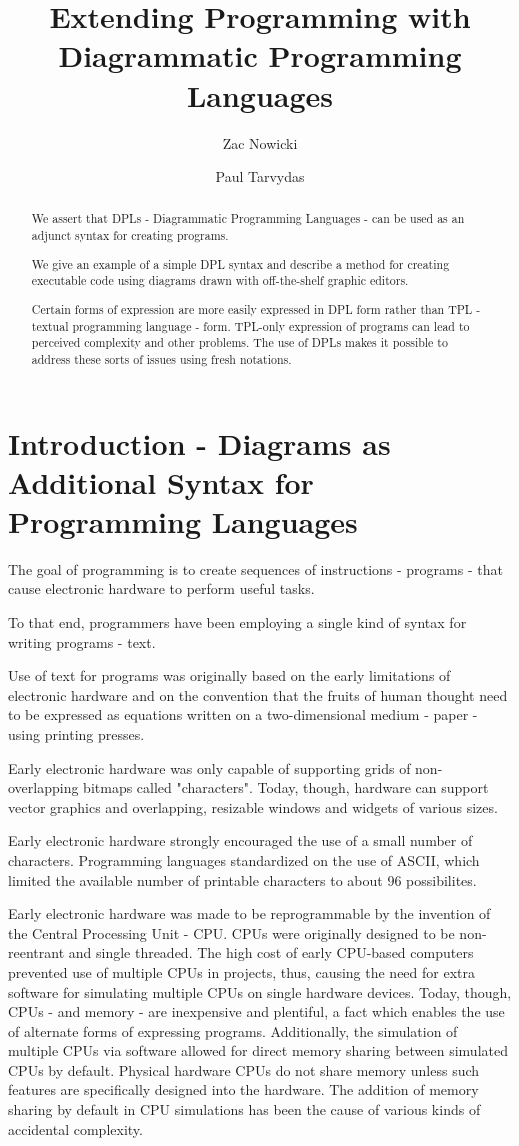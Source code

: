 \documentclass[10pt,anonymous,review]{acmart}
\title{Extending Programming with Diagrammatic Programming Languages}
\author{Zac Nowicki}
\affiliation{
  \institution{Kagi Inc.}
  \city{Palo Alto}
  \state{CA}
  \country{USA}
}
\author{Paul Tarvydas}
\affiliation{
  \institution{Retired}
  \city{Toronto}
  \state{Ontario}
  \country{Canada}
}
\begin{document}
\begin{abstract}

We assert that DPLs - Diagrammatic Programming Languages - can be used as an adjunct syntax for creating programs.

We give an example of a simple DPL syntax and describe a method for creating executable code using diagrams drawn with off-the-shelf graphic editors.
  
Certain forms of expression are more easily expressed in DPL form rather than TPL - textual programming language - form. TPL-only expression of programs can lead to perceived complexity and other problems. The use of DPLs makes it possible to address these sorts of issues using fresh notations.
\end{abstract}

\maketitle

\section{Introduction - Diagrams as Additional Syntax for Programming Languages}
The goal of programming is to create sequences of instructions -
programs - that cause electronic hardware to perform useful tasks.

To that end, programmers have been employing a single kind of syntax for writing programs -
text.

Use of text for programs was originally based on the early limitations of
electronic hardware and on the convention that the fruits of human thought need to be
expressed as equations written on a two-dimensional medium - paper -
using printing presses.

Early electronic hardware was only capable of supporting grids of
non-overlapping bitmaps called "characters". Today, though, hardware can
support vector graphics and overlapping, resizable windows and widgets of various sizes.

Early electronic hardware strongly encouraged the use of a small number of characters. Programming languages standardized on the use of ASCII, which limited the available number of printable characters to about 96 possibilites.

Early electronic hardware was made to be reprogrammable by the invention of
the Central Processing Unit - CPU. CPUs were originally designed to be
non-reentrant and single threaded. The high cost of early CPU-based
computers prevented use of multiple CPUs in projects, thus, causing the
need for extra software for simulating multiple CPUs on single
hardware devices. Today, though, CPUs - and memory - are inexpensive and
plentiful, a fact which enables the use of alternate forms of
expressing programs. Additionally, the simulation of multiple CPUs via software 
allowed for direct memory sharing between simulated CPUs by default. Physical 
hardware CPUs do not share memory unless such features are specifically 
designed into the hardware. The addition of memory sharing by default in CPU simulations
has been the cause of various kinds of accidental complexity.
\end{document}
